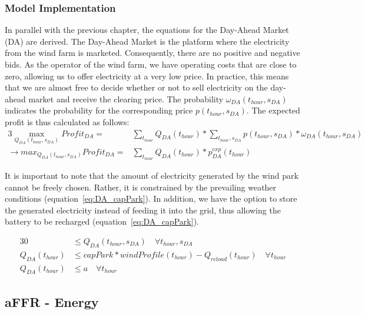 \subsubsection{Model Implementation}
In parallel with the previous chapter, the equations for the Day-Ahead Market (DA) are derived.
The Day-Ahead Market is the platform where the electricity from the wind farm is marketed. Consequently, there are no positive and negative bids.
As the operator of the wind farm, we have operating costs that are close to zero, allowing us to offer electricity at a very low price.
In practice, this means that we are almost free to decide whether or not to sell electricity on the day-ahead market and receive the clearing price.
The probability $\omega_{DA}(t_{hour}, s_{DA})$ indicates the probability for the corresponding price $p(t_{hour}, s_{DA})$.
The expected profit is thus calculated as follows:\\

\begin{alignat}{3}
	\max_{Q_{DA}(t_{hour}, s_{DA})} Profit_{DA}	=            & \sum_{t_{hour}} Q_{DA}(t_{hour}) * \sum_{t_{hour}, s_{DA}}  p(t_{hour}, s_{DA}) * \omega_{DA}(t_{hour}, s_{DA}) \\
	\rightarrow max_{Q_{DA}(t_{hour}, s_{DA})} Profit_{DA}	= & \sum_{t_{hour}} Q_{DA}(t_{hour}) * p^{exp}_{DA}(t_{hour})
\end{alignat}

It is important to note that the amount of electricity generated by the wind park cannot be freely chosen.
Rather, it is constrained by the prevailing weather conditions (equation~\ref{eq:DA_capPark}).
In addition, we have the option to store the generated electricity instead of feeding it into the grid,
thus allowing the battery to be recharged (equation~\ref{eq:DA_capPark}).


\begin{alignat}{3}
	0                & \leq Q_{DA}(t_{hour}, s_{DA}) \quad\forall  t_{hour}, s_{DA}      \label{eq:DA_nonNeg}                  \\
	Q_{DA}(t_{hour}) & \leq capPark * windProfile(t_{hour}) - Q_{reload}(t_{hour}) \quad\forall t_{hour} \label{eq:DA_capPark} \\
	Q_{DA}(t_{hour}) & \leq a \quad\forall t_{hour} \label{eq:DA_a}
\end{alignat}

\subsection{aFFR - Energy}
\label{subsec:RA}
